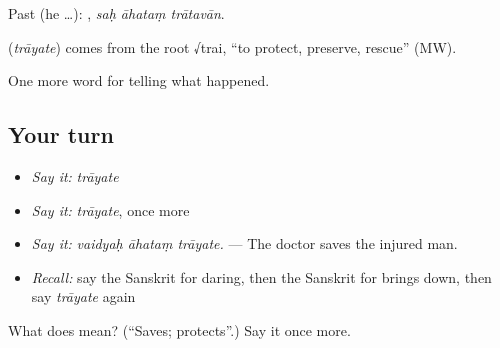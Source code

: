 Past (he …):   , \emph{saḥ āhataṃ trātavān}.

\begin{cousinweb}
\textbf{} (\emph{trāyate}) comes from the root √trai, \textquotedblleft{}to protect, preserve, rescue\textquotedblright{} (MW).
\end{cousinweb}

\begin{grammarlens}[title={What you've built}]
One more word for telling what happened.
\end{grammarlens}

\subsection*{Your turn}
\begin{itemize}
\raggedright
  \item \emph{Say it:} \emph{trāyate}
  \item \emph{Say it:} \emph{trāyate}, once more
  \item \emph{Say it:} \emph{vaidyaḥ āhataṃ trāyate.} — The doctor saves the injured man.
  \item \emph{Recall:} say the Sanskrit for daring, then the Sanskrit for brings down, then say \emph{trāyate} again
\end{itemize}

\begin{tcolorbox}[breakable,colback=teal!4,colframe=teal!35!black,title={Before you move on}]
What does  mean? (\textquotedblleft{}Saves; protects\textquotedblright{}.) Say it once more.
\end{tcolorbox}
